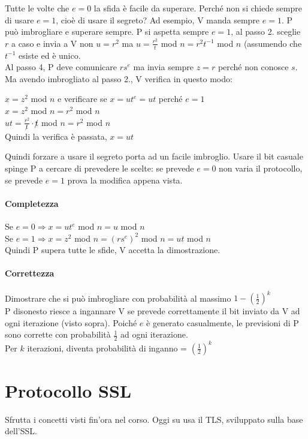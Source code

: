 \documentclass[10pt]{book}
\begin{document}
Tutte le volte che $e=0$ la sfida è facile da superare. Perché non si chiede sempre di usare $e=1$, cioè di usare il segreto? Ad esempio, V manda sempre $e=1$. P può imbrogliare e superare sempre. P si aspetta sempre $e=1$, al passo 2. sceglie $r$ a caso e invia a V non $u=r^2$ ma $u = \frac{r^2}{t}$ mod $n = r^2t^{-1}$ mod $n$ (assumendo che $t^{-1}$ esiste ed è unico.\\
Al passo 4, P deve comunicare $rs^e$ ma invia sempre $z = r$ perché non conosce $s$. Ma avendo imbrogliato al passo 2., V verifica in questo modo:
\begin{list}{}{}
	\item $x = z^2$ mod $n$ e verificare se $x = ut^e = ut$ perché $e = 1$\\
	$x = z^2$ mod $n = r^2$ mod $n$\\
	$ut = \frac{r^2}{\not t}\cdot \not t$ mod $n = r^2$ mod $n$\\
	Quindi la verifica è passata, $x=ut$
\end{list}
Quindi forzare a usare il segreto porta ad un facile imbroglio. Usare il bit casuale spinge P a cercare di prevedere le scelte: se prevede $e=0$ non varia il protocollo, se prevede $e=1$ prova la modifica appena vista.
\paragraph{Completezza} Se $e=0\Rightarrow x=ut^e$ mod $n = u$ mod $n$\\
Se $e=1\Rightarrow x= z^2$ mod $n = (rs^e)^2$ mod $n = ut$ mod $n$\\
Quindi P supera tutte le sfide, V accetta la dimostrazione.
\paragraph{Correttezza} Dimostrare che si può imbrogliare con probabilità al massimo $1-\left(\frac{1}{2}\right)^k$\\
P disonesto riesce a ingannare V se prevede correttamente il bit inviato da V ad ogni iterazione (visto sopra). Poiché $e$ è generato casualmente, le previsioni di P sono corrette con probabilità $\frac{1}{2}$ ad ogni iterazione.\\
Per $k$ iterazioni, diventa probabilità di inganno = $\left(\frac{1}{2}\right)^k$
\section{Protocollo SSL}
Sfrutta i concetti visti fin'ora nel corso. Oggi su usa il TLS, sviluppato sulla base dell'SSL.
\end{document}
